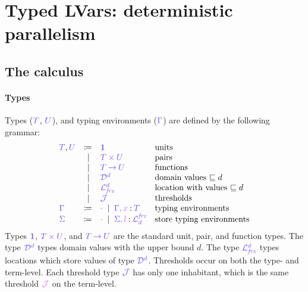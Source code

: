 \documentclass[main.tex]{subfiles}
\begin{document}
\section{Typed LVars: deterministic parallelism}

\subsection{The \typedlambdalvar calculus}


\paragraph*{Types}
Types ($\ty{T}$, $\ty{U}$),  and typing environments ($\ty{\Gamma}$) are defined by the following grammar:
\[
\begin{array}{lrll}
  \ty{T}, \ty{U}
  & \coloneqq & \ty{\tyunit}        & \text{units} \\
  & \sep      & \ty{\typrod{T}{U}}  & \text{pairs} \\
  & \sep      & \ty{\tyfun{T}{U}}   & \text{functions}\\
  & \sep      & \ty{\tyD{d}}        & \text{domain values }{\sqsubseteq d}\\
  & \sep      & \ty{\tyL{\frz}{d}}  & \text{location with values }{\sqsubseteq d}\\
  & \sep      & \ty{\tyJ}           & \text{thresholds}
  \\
  \ty{\Gamma}
  & \coloneqq & \ty{\envemp}
    \sep        \ty{\ty{\Gamma},\tmty{x}{T}}
                                    & \text{typing environments}
  \\
  \ty{\Sigma}
  & \coloneqq & \ty{\envemp}
    \sep        \ty{\ty{\Sigma},\tmty{l}{\tyL{d}{\frz}}}
                                    & \text{store typing environments}
\end{array}
\]
Types $\ty{\tyunit}$, $\ty{\typrod{T}{U}}$, and $\ty{\tyfun{T}{U}}$ are the standard unit, pair, and function types.
The type $\tyD{d}$ types domain values with the upper bound $d$.
The type $\tyL{\frz}{d}$ types locations which store values of type $\tyD{d}$.
Thresholds occur on both the type- and term-level. Each threshold type $\tyJ$ has only one inhabitant, which is the same threshold $\tmJ$ on the term-level.
\end{document}
